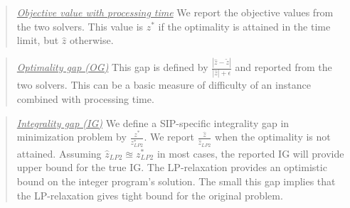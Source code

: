 \begin{quote}
	\noindent\underline{\textit{Objective value with processing time}} We report the objective values from the two solvers. This value is $z^*$ if the optimality is attained in the time limit, but $\hat{z}$ otherwise.
\end{quote}

\begin{quote}
	\noindent\underline{\textit{Optimality gap (OG)}} This gap is defined by $\frac{|\hat{z}-\tilde{z}|}{|\hat{z}|+\epsilon}$ and  reported from the two solvers. This can be a basic measure of difficulty of an instance combined with processing time.
\end{quote}


\begin{quote}
	\noindent\underline{\textit{Integrality gap (IG)}} We define a SIP-specific integrality gap in minimization problem by $\frac{z^*}{z^*_{LP2}}$. We report $\frac{\hat{z}}{\hat{z}_{LP2}}$ when the optimality is not attained. Assuming $\hat{z}_{LP2}\approxeq z^*_{LP2}$ in most cases, the reported IG will provide upper bound for the true IG. The LP-relaxation provides an optimistic bound on the integer program's solution. The small this gap implies that the LP-relaxation gives tight bound for the original problem.  %
\end{quote}

